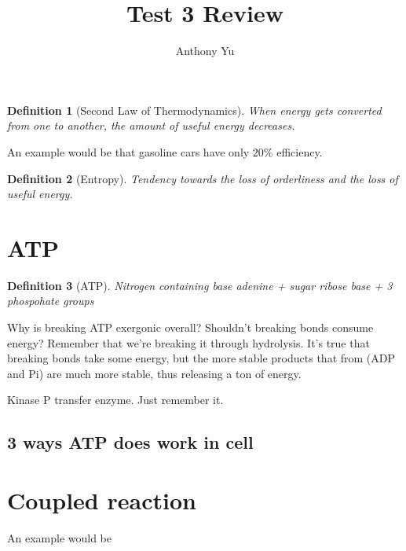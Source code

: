 \documentclass[12pt]{article}
\title{Test 3 Review}
\author{Anthony Yu}
\begin{document}
\newcommand{\problem}[1]{\subsection*{Problem {#1}}}
\newenvironment{enumAlph}{\begin{enumerate}[label=(\alph*)]}{\end{enumerate}}

\makeatletter
\newcommand{\skipitems}[1]{%
\addtocounter{\@enumctr}{#1}%
}
\makeatother

\newcommand{\chunit}[3]{\qty{#1}{{#2}\,\ce{#3}}}
\newcommand{\chuniteval}[3]{\qty[evaluate-expression]{#1}{{#2}\,\ce{#3}}}

\newtheorem{definition}{Definition}

\maketitle

\begin{definition}[Second Law of Thermodynamics]
    When energy gets converted from one to another, the amount of useful energy decreases. 
\end{definition}
An example would be that gasoline cars have only $20\%$ efficiency. 
\begin{definition}[Entropy]
    Tendency towards the loss of orderliness and the loss of useful energy.
\end{definition}

\section{ATP}
\begin{definition}[ATP]
    Nitrogen containing base adenine + sugar ribose base + 3 phospohate groups
\end{definition}
Why is breaking ATP exergonic overall? Shouldn't breaking bonds consume energy?
Remember that we're breaking it through hydrolysis. It's true that
breaking bonds take some energy, but the more stable products that from
(ADP and Pi) are much more stable, thus releasing a ton of energy. 

Kinase P transfer enzyme. Just remember it. 

\subsection{3 ways ATP does work in cell}


\section{Coupled reaction}
An example would be 
\end{document}
